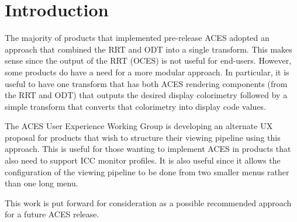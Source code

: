 \unnumberedformat	    %
\chapter{Introduction} 	%

The majority of products that implemented pre-release ACES adopted an approach that combined the RRT and ODT into a single transform. This makes sense since the output of the RRT (OCES) is not useful for end-users. However, some products do have a need for a more modular approach. In particular, it is useful to have one transform that has both ACES rendering components (from the RRT and ODT) that outputs the desired display colorimetry followed by a simple transform that converts that colorimetry into display code values. 

The ACES User Experience Working Group is developing an alternate UX proposal for products that wish to structure their viewing pipeline using this approach. This is useful for those wanting to implement ACES in products that also need to support ICC monitor profiles. It is also useful since it allows the configuration of the viewing pipeline to be done from two smaller menus rather than one long menu.

This work is put forward for consideration as a possible recommended approach for a future ACES release.